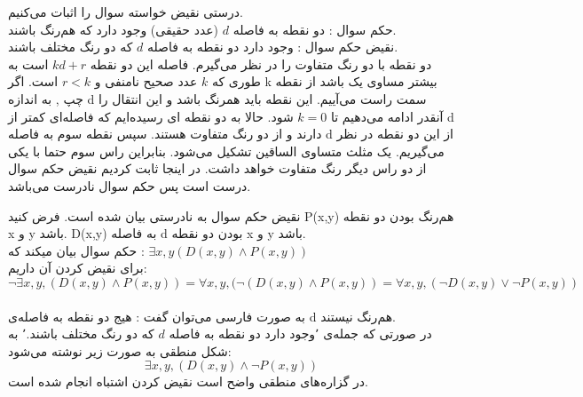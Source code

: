 \documentclass[11pt,largemargins]{h2wp}
\begin{document}
\solution
 درستی نقیض خواسته سوال را اثبات می‌کنیم.\\
حکم سوال : دو نقطه به فاصله $d$ (عدد حقیقی) وجود دارد که هم‌رنگ باشند.\\
نقیض حکم سوال : وجود دارد دو نقطه به فاصله $d$ که دو رنگ مختلف باشند.\\
دو نقطه با دو رنگ متفاوت را در نظر می‌گیرم. فاصله این دو نقطه $ kd + r $ است به طوری که $ k $ عدد صحیح نامنفی و $ r < k $  است. 
اگر k بیشتر مساوی یک باشد از نقطه چپ , به اندازه d سمت راست می‌آییم. این نقطه باید همرنگ باشد و این انتقال را آنقدر ادامه می‌دهیم تا $ k = 0 $ شود. حالا به دو نقطه ای رسیده‌ایم که فاصله‌ای کمتر از d دارند و از دو رنگ متفاوت هستند. 
سپس نقطه سوم به فاصله d از این دو نقطه در نظر می‌گیریم. یک مثلث متساوی الساقین تشکیل می‌شود. بنابراین راس سوم حتما با یکی از دو راس دیگر رنگ متفاوت خواهد داشت. در اینجا ثابت کردیم نقیض حکم سوال درست است پس حکم سوال نادرست می‌باشد. 






 \notes

نقیض حکم سوال به نادرستی بیان شده است. فرض کنید P(x,y) هم‌رنگ بودن دو نقطه  x و y باشد. D(x,y) به فاصله d بودن دو نقطه  x و y باشد.\\
حکم سوال بیان میکند که : 
$ \exists x,y ( D(x,y) \wedge P(x,y)) $
\\
برای نقیض کردن آن داریم:\\
$$ \neg \exists x,y, ( D(x,y) \wedge P(x,y)) = \forall x,y, (\neg (D(x,y) \wedge P(x,y)) = \forall x,y, (\neg D(x,y) \vee \neg P(x,y)) $$
\\
به صورت فارسی می‌توان گفت : هیج دو نقطه به فاصله‌ی d هم‌رنگ نیستند.\\
در صورتی که جمله‌ی ٬وجود دارد دو نقطه به فاصله $d$ که دو رنگ مختلف باشند.٬ به شکل منطقی به صورت زیر نوشته می‌شود:
$$ \exists x,y, (D(x,y) \wedge \neg P(x,y)) $$ 
در گزاره‌های منطقی واضح است نقیض کردن اشتباه انجام شده است.\\
\end{document}

